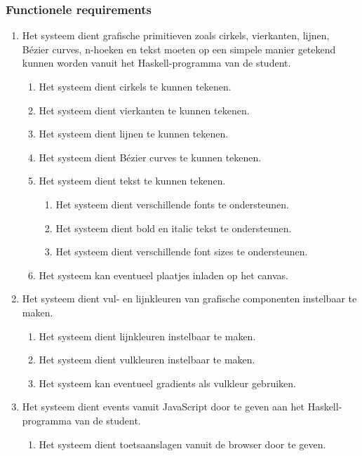 \subsubsection{Functionele requirements}
\begin{enumerate}[{R}1]
	\item Het systeem dient grafische primitieven zoals cirkels, vierkanten, lijnen, Bézier curves, n-hoeken en tekst moeten op een simpele manier getekend kunnen worden vanuit het Haskell-programma van de student.
	\begin{enumerate}
		\item Het systeem dient cirkels te kunnen tekenen.
		\item Het systeem dient vierkanten te kunnen tekenen.
		\item Het systeem dient lijnen te kunnen tekenen.
		\item Het systeem dient Bézier curves te kunnen tekenen.
		\item Het systeem dient tekst te kunnen tekenen.
		\begin{enumerate}
			\item Het systeem dient verschillende fonts te ondersteunen.
			\item Het systeem dient bold en italic tekst te ondersteunen.
			\item Het systeem dient verschillende font sizes te ondersteunen.
		\end{enumerate}
		\item Het systeem kan eventueel plaatjes inladen op het canvas.
	\end{enumerate}
	\item Het systeem dient vul- en lijnkleuren van grafische componenten instelbaar te maken.
	\begin{enumerate}
		\item Het systeem dient lijnkleuren instelbaar te maken.
		\item Het systeem dient vulkleuren instelbaar te maken.
		\item Het systeem kan eventueel gradients als vulkleur gebruiken.
	\end{enumerate}
	\item Het systeem dient events vanuit JavaScript door te geven aan het Haskell-programma van de student.
	\begin{enumerate}
		\item Het systeem dient toetsaanslagen vanuit de browser door te geven.

\end{enumerate}
\end{enumerate}

